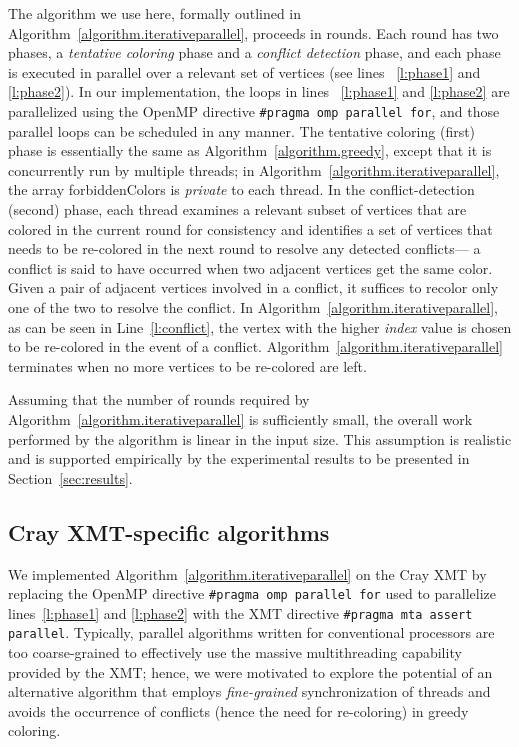 \documentclass{article}
\begin{document}
The algorithm we use here, formally outlined in Algorithm~\ref{algorithm.iterativeparallel},
proceeds in rounds. Each round has two phases, 
a {\em tentative coloring} phase and a {\em conflict detection} phase, and each phase is 
executed in parallel  over a relevant set of vertices (see lines ~\ref{l:phase1} and \ref{l:phase2}). 
In our implementation, the loops in lines ~\ref{l:phase1} and 
\ref{l:phase2} are parallelized using  the OpenMP directive \texttt{\#pragma omp parallel for}, 
and those parallel loops can  be scheduled in any manner.
The tentative coloring (first) phase is essentially the same as Algorithm~\ref{algorithm.greedy}, 
except that it is concurrently run by multiple threads;
in Algorithm~\ref{algorithm.iterativeparallel}, the array \textsf{forbiddenColors} is 
{\em private} to each thread.
In the conflict-detection (second) phase, each  thread examines a relevant subset
of vertices that are colored in the current round for consistency and identifies a set of vertices
that needs to be re-colored in the next round to resolve any detected conflicts--- a conflict is
said to have occurred when two adjacent vertices get the same color.
Given a pair of adjacent vertices involved in a conflict, 
it suffices to recolor only one of the two to resolve the conflict. 
In Algorithm~\ref{algorithm.iterativeparallel}, as can be seen in Line~\ref{l:conflict}, 
the vertex with the higher {\em index} value is chosen to be re-colored in the event of a conflict. 
Algorithm~\ref{algorithm.iterativeparallel} terminates when no more 
vertices to be re-colored are left. 

Assuming that the number of rounds required by Algorithm~\ref{algorithm.iterativeparallel} is
sufficiently small, the overall work performed by the algorithm is linear in the input size.
This assumption is realistic and is supported empirically by the experimental results  
to be presented in Section~\ref{sec:results}.


\subsection{Cray XMT-specific algorithms}
\label{sec:dataflow}

We implemented Algorithm~\ref{algorithm.iterativeparallel} on the Cray XMT by replacing  the
OpenMP directive  \texttt{\#pragma omp parallel for} used to parallelize lines~\ref{l:phase1}  and \ref{l:phase2} 
with the XMT directive \texttt{\#pragma mta assert parallel}.
Typically, parallel algorithms written for conventional processors are too coarse-grained 
to effectively use the massive multithreading capability provided by the XMT; 
hence, we were motivated to explore the potential of an alternative algorithm that employs {\em fine-grained}
synchronization of threads and avoids the occurrence of conflicts (hence the need for re-coloring)
in greedy coloring.
\end{document}
